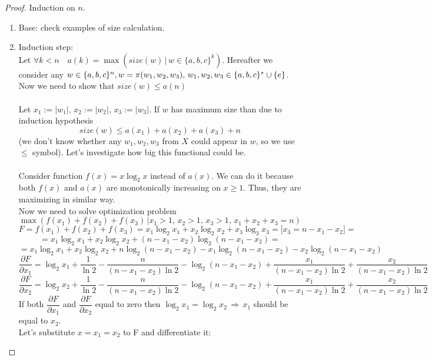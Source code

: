 \documentclass{article}
\begin{document}
\begin{proof}
	Induction on $n$.
	\begin{enumerate}
		\item Base: check examples of size calculation.
		\item Induction step:\\ 
		Let $\forall k < n \quad a (k) = \max (size(w) \,|\, w \in \{a,b,c\}^k)$. Hereafter we consider any $w \in \{a, b, c\}^{n}, \,\\ w = \pi (w_1, w_2, w_3), \, w_1, w_2, w_3 \in \{a, b, c\}^*\cup \{e\}$. Now we need to show that $size(w) \le a(n)$\\
		\\
		Let $ x_1 := |w_1|, \, x_2 := |w_2|, \, x_3 := |w_3|$. If $w$ has maximum size than due to induction hypothesis \\ 
		\begin{equation}
			size(w) \le a(x_1) + a(x_2) + a(x_3) + n
		\end{equation}
		 (we don't know whether any $w_1, w_2, w_3$ from $X$ could appear in $w$, so we use $\le$ symbol). Let's investigate how big this functional could be.\\
		\\
		Consider function $f(x) = x\log_2{x}$ instead of $a(x)$. We can do it because both $f(x)$ and $a(x)$ are monotonically increasing on $x \ge 1$. Thus, they are maximizing in similar way.
		\\
		Now we need to solve optimization problem 
		$$\max(f(x_1) + f(x_2) + f(x_3) \, | x_1>1,\, x_2>1,\, x_3>1,\, x_1 + x_2 + x_3 = n)$$
		$$F = f(x_1) + f(x_2) + f(x_3) = x_1 \log_2 x_1 + x_2 \log_2 x_2 + x_3 \log_3 x_3 = \Big[x_3 = n - x_1 - x_2\Big] =$$
		$$ = x_1 \log_2 x_1 + x_2 \log_2 x_2 + (n - x_1 - x_2) \log_2 (n-x_1 - x_2) = $$
		$$= x_1\log_2 x_1 + x_2 \log_2 x_2 + n \log_2 (n - x_1 - x_2) - x_1 \log_2 (n - x_1 - x_2) - x_2 \log_2(n - x_1 - x_2)$$
		$$\frac{\partial F}{\partial x_1} = \log_2 x_1 + \frac{1}{\ln 2} - \frac{n}{(n - x_1 - x_2)\ln 2} - \log_2 (n - x_1 - x_2) + \frac{x_1}{(n-x_1 - x_2)\ln 2} + \frac{x_2}{(n - x_1 - x_2) \ln 2}$$
		$$\frac{\partial F}{\partial x_2} = \log_2 x_2 + \frac{1}{\ln 2} - \frac{n}{(n - x_1 - x_2)\ln 2} - \log_2 (n - x_1 - x_2) + \frac{x_1}{(n-x_1 - x_2)\ln 2} + \frac{x_2}{(n - x_1 - x_2) \ln 2} $$
		If both $\dfrac{\partial F}{\partial x_1}$ and $\dfrac{\partial F}{\partial x_2}$ equal to zero then $\log_2 x_1 = \log_2 x_2 \, \Rightarrow \, x_1$ should be equal to $x_2$.
		\\
		Let's substitute $x = x_1 = x_2$ to F and differentiate it: 
		

\end{enumerate}
\end{proof}
\end{document}
